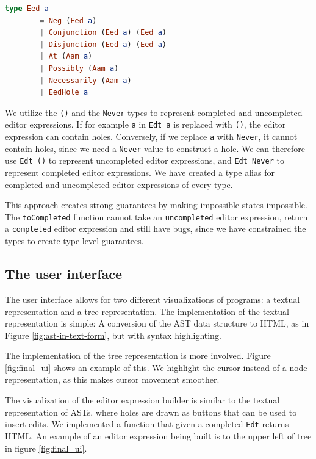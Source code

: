 \begin{lstlisting}[language=elm,%
                   label="eed-definitions",%
                   gobble=4,%
                   ]
    type Eed a
        = Neg (Eed a)
        | Conjunction (Eed a) (Eed a)
        | Disjunction (Eed a) (Eed a)
        | At (Aam a)
        | Possibly (Aam a)
        | Necessarily (Aam a)
        | EedHole a
\end{lstlisting}

We utilize the \texttt{()} and the \texttt{Never} types to represent
completed and uncompleted editor expressions. If for example \texttt{a} in
\texttt{Edt a} is replaced with \texttt{()}, the editor expression can contain
holes. Conversely, if we replace \texttt{a} with \texttt{Never}, it cannot
contain holes, since we need a \texttt{Never} value to construct a hole. We can
therefore use \texttt{Edt ()} to represent uncompleted editor expressions, and
\texttt{Edt Never} to represent completed editor expressions. We have created a
type alias for completed and uncompleted editor expressions of every type.

This approach creates strong guarantees by making impossible states impossible.
The \texttt{toCompleted} function cannot take an \texttt{uncompleted} editor
expression, return a \texttt{completed} editor expression and still have bugs,
since we have constrained the types to create type level guarantees.

\subsection{The user interface}
\label{user-interface}

The user interface allows for two different visualizations of programs: a
textual representation and a tree representation. The implementation of the
textual representation is simple: A conversion of the AST data structure to
HTML, as in Figure \ref{fig:ast-in-text-form}, but with syntax highlighting.

The implementation of the tree representation is more involved. Figure
\ref{fig:final_ui} shows an example of this. We highlight the cursor instead of
a node representation, as this makes cursor movement smoother.

The visualization of the editor expression builder is similar to the textual
representation of ASTs, where holes are drawn as buttons that can be used to
insert edits. We implemented a function that given a completed \texttt{Edt}
returns HTML. An example of an editor expression being built is to the upper
left of tree in figure \ref{fig:final_ui}.

